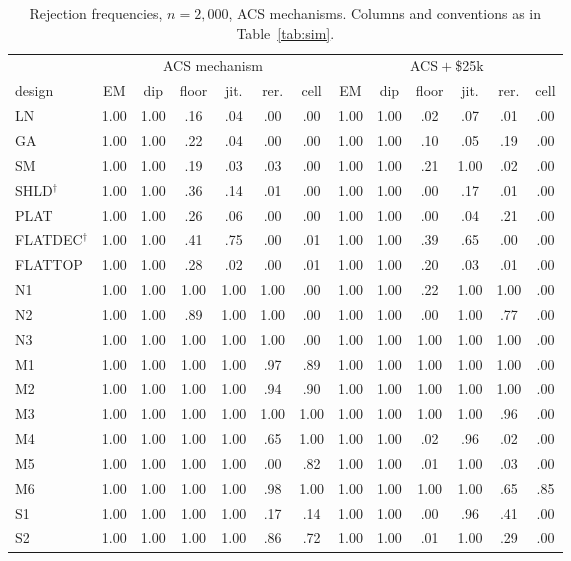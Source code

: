 \begin{table}[h]
\centering\footnotesize
\setlength{\tabcolsep}{4pt}
\caption{Rejection frequencies, $n=2{,}000$, ACS mechanisms. Columns and conventions as in Table~\ref{tab:sim}.}\label{tab:S-sim2a}
\begin{tabular}{l*{6}{c}@{\hspace{10pt}}*{6}{c}}
\toprule
 & \multicolumn{6}{c}{ACS mechanism} & \multicolumn{6}{c}{ACS${}+{}$\$25k}\\
\cmidrule(lr){2-7}\cmidrule(lr){8-13}
design & EM & dip & floor & jit. & rer. & cell & EM & dip & floor & jit. & rer. & cell\\
\midrule
LN & 1.00 & 1.00 & .16 & .04 & .00 & .00 & 1.00 & 1.00 & .02 & .07 & .01 & .00 \\
GA & 1.00 & 1.00 & .22 & .04 & .00 & .00 & 1.00 & 1.00 & .10 & .05 & .19 & .00 \\
SM & 1.00 & 1.00 & .19 & .03 & .03 & .00 & 1.00 & 1.00 & .21 & 1.00 & .02 & .00 \\
SHLD$^\dagger$ & 1.00 & 1.00 & .36 & .14 & .01 & .00 & 1.00 & 1.00 & .00 & .17 & .01 & .00 \\
PLAT & 1.00 & 1.00 & .26 & .06 & .00 & .00 & 1.00 & 1.00 & .00 & .04 & .21 & .00 \\
FLATDEC$^\dagger$ & 1.00 & 1.00 & .41 & .75 & .00 & .01 & 1.00 & 1.00 & .39 & .65 & .00 & .00 \\
FLATTOP & 1.00 & 1.00 & .28 & .02 & .00 & .01 & 1.00 & 1.00 & .20 & .03 & .01 & .00 \\
\midrule
N1 & 1.00 & 1.00 & 1.00 & 1.00 & 1.00 & .00 & 1.00 & 1.00 & .22 & 1.00 & 1.00 & .00 \\
N2 & 1.00 & 1.00 & .89 & 1.00 & 1.00 & .00 & 1.00 & 1.00 & .00 & 1.00 & .77 & .00 \\
N3 & 1.00 & 1.00 & 1.00 & 1.00 & 1.00 & .00 & 1.00 & 1.00 & 1.00 & 1.00 & 1.00 & .00 \\
M1 & 1.00 & 1.00 & 1.00 & 1.00 & .97 & .89 & 1.00 & 1.00 & 1.00 & 1.00 & 1.00 & .00 \\
M2 & 1.00 & 1.00 & 1.00 & 1.00 & .94 & .90 & 1.00 & 1.00 & 1.00 & 1.00 & 1.00 & .00 \\
M3 & 1.00 & 1.00 & 1.00 & 1.00 & 1.00 & 1.00 & 1.00 & 1.00 & 1.00 & 1.00 & .96 & .00 \\
M4 & 1.00 & 1.00 & 1.00 & 1.00 & .65 & 1.00 & 1.00 & 1.00 & .02 & .96 & .02 & .00 \\
M5 & 1.00 & 1.00 & 1.00 & 1.00 & .00 & .82 & 1.00 & 1.00 & .01 & 1.00 & .03 & .00 \\
M6 & 1.00 & 1.00 & 1.00 & 1.00 & .98 & 1.00 & 1.00 & 1.00 & 1.00 & 1.00 & .65 & .85 \\
S1 & 1.00 & 1.00 & 1.00 & 1.00 & .17 & .14 & 1.00 & 1.00 & .00 & .96 & .41 & .00 \\
S2 & 1.00 & 1.00 & 1.00 & 1.00 & .86 & .72 & 1.00 & 1.00 & .01 & 1.00 & .29 & .00 \\
\bottomrule
\end{tabular}
\end{table}

